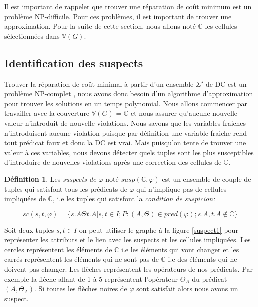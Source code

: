 \documentclass[letterpaper, 12pt]{report}
\theoremstyle{definition}
\newtheorem{mydef}{Définition}
\begin{document}
Il est important de rappeler que trouver une réparation de coût minimum est un problème NP-difficile. Pour ces problèmes, il est important de trouver une approximation. Pour la suite de cette section, nous allons noté $\mathbb{C}$ les cellules sélectionnées dans $\mathbb{V}(G)$.

\subsection{Identification des suspects}

Trouver la réparation de coût minimal à partir d'un ensemble $\Sigma'$ de DC est un problème NP-complet \cite{main}, nous avons donc besoin d'un algorithme d'approximation pour trouver les solutions en un temps polynomial. Nous allons commencer par travailler avec la couverture $\mathbb{V}(G)$ = $\mathbb{C}$ et nous assurer qu'aucune nouvelle valeur n'introduit de nouvelle violations. Nous savons que les variables fraiches n'introduisent aucune violation puisque par définition une variable fraiche rend tout prédicat faux et donc la DC est vrai. Mais puisqu'on tente de trouver une valeur à ces variables, nous devons détecter quels tuples sont les plus susceptibles d'introduire de nouvelles violations après une correction des cellules de $\mathbb{C}$.

\begin{mydef}
	Les \emph{suspects de $\varphi$} noté $susp( \mathbb{C}, \varphi)$ est un ensemble de couple de tuples qui satisfont tous les prédicats de $\varphi$ qui n'implique pas de cellules impliquées de $\mathbb{C}$, i.e les tuples qui satisfont la \emph{condition de suspicion:}

	$$ sc(s,t,\varphi) = \{ s.A \Theta t.A | s,t \in I ; P:(A,\Theta) \in pred(\varphi) ; s.A,t.A \not\in \mathbb{C} \}  $$
	 
\end{mydef}

Soit deux tuples $s,t \in I$ on peut utiliser le graphe à la figure \ref{suspect1} pour représenter les attributs et le lien avec les suspects et les cellules impliquées. Les cercles représentent les éléments de $\mathbb{C}$ i.e les éléments qui vont changer et les carrés représentent les éléments qui ne sont pas de $\mathbb{C}$ i.e des éléments qui ne doivent pas changer. Les flèches représentent les opérateurs de nos prédicats. Par exemple la flèche allant de 1 à 5 représentent l'opérateur $\Theta_A$ du prédicat $(A,\Theta_A)$. Si toutes les flèches noires de $\varphi$ sont satisfait alors nous avons un suspect.
\end{document}
